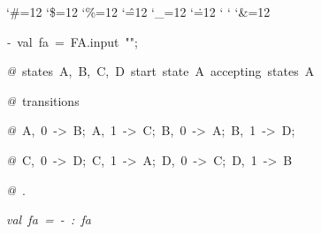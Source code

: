 \begin{list}{}
{\setlength{\leftmargin}{\leftmargini}
\setlength{\rightmargin}{0cm}
\setlength{\itemindent}{0cm}
\setlength{\listparindent}{0cm}
\setlength{\itemsep}{0cm}
\setlength{\parsep}{0cm}
\setlength{\labelsep}{0cm}
\setlength{\labelwidth}{0cm}
\catcode`\#=12
\catcode`\$=12
\catcode`\%=12
\catcode`\^=12
\catcode`\_=12
\catcode`\.=12
\catcode`
\catcode`
\catcode`\&=12
\ttfamily}
\small
\item[]\textsl{-\ }val\ fa\ =\ FA.input\ "";
\item[]\textsl{@\ }states\ A,\ B,\ C,\ D\ start\ state\ A\ accepting\ states\ A
\item[]\textsl{@\ }transitions
\item[]\textsl{@\ }A,\ 0\ ->\ B;\ A,\ 1\ ->\ C;\ B,\ 0\ ->\ A;\ B,\ 1\ ->\ D;
\item[]\textsl{@\ }C,\ 0\ ->\ D;\ C,\ 1\ ->\ A;\ D,\ 0\ ->\ C;\ D,\ 1\ ->\ B
\item[]\textsl{@\ }.
\item[]\textsl{val\ fa\ =\ -\ :\ fa}
\end{list}
